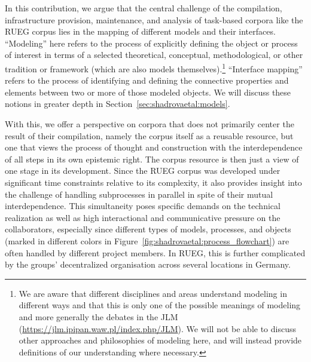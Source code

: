 \documentclass[output=paper,colorlinks,citecolor=brown]{langscibook}
\begin{document}
In this contribution, we argue that the central challenge of the compilation, infrastructure provision, maintenance, and analysis of task-based corpora like the RUEG corpus lies in the mapping of different models and their interfaces. “Modeling” here refers to the process of explicitly defining the object or process of interest in terms of a selected theoretical, conceptual, methodological, or other tradition or framework (which are also models themselves).\footnote{We are aware that different disciplines and areas understand modeling in different ways and that this is only one of the possible meanings of modeling \parencite[see for example][]{stachowiak1973allgemeine,white1973metahistory} and more generally the debates in the JLM (\url{https://jlm.ipipan.waw.pl/index.php/JLM}). We will not be able to discuss other approaches and philosophies of modeling here, and will instead provide definitions of our understanding where necessary.} “Interface mapping” refers to the process of identifying and defining the connective properties and elements between two or more of those modeled objects. We will discuss these notions in greater depth in Section~\ref{sec:shadrovaetal:models}.

With this, we offer a perspective on corpora that does not primarily center the result of their compilation, namely the corpus itself as a reusable resource, but one that views the process of thought and construction with the interdependence of all steps in its own epistemic right. The corpus resource is then just a view of one stage in its development. Since the RUEG corpus was developed under significant time constraints relative to its complexity, it also provides insight into the challenge of handling subprocesses in parallel in spite of their mutual interdependence. This simultaneity poses specific demands on the technical realization as well as high interactional and communicative pressure on the collaborators, especially since different types of models, processes, and objects (marked in different colors in Figure~\ref{fig:shadrovaetal:process_flowchart}) are often handled by different project members. In RUEG, this is further complicated by the groups' decentralized organisation across several locations in Germany.
\end{document}
